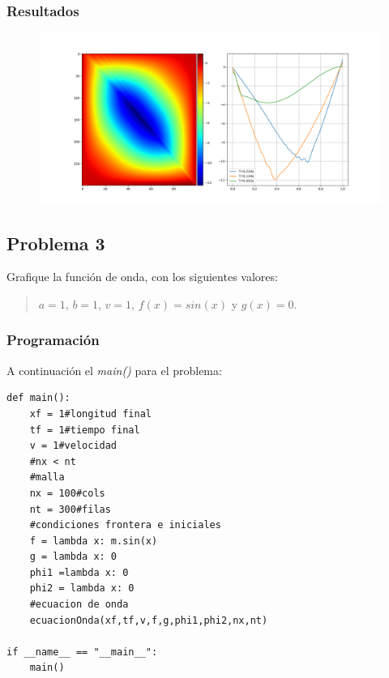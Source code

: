 \documentclass[a4paper,12pt]{article}
\newcommand{\eq}[1]{$#1$}
\begin{document}
    \subsubsection{Resultados}
    \begin{figure}[h]
        \centering
        \includegraphics[width=\textwidth]{graph2.png}
    \end{figure}

    \subsection{Problema 3}
    Grafique la función de onda, con los siguientes valores:
    \begin{quote}
        \centering
        \eq{a = 1}, \eq{b = 1}, \eq{v = 1}, \eq{f(x) = sin(x)} y \eq{g(x) = 0}.
    \end{quote}
    \subsubsection{Programación}
    A continuación el \emph{main()} para el problema:

\begin{lstlisting}[frame=single]
    def main():
    xf = 1#longitud final
    tf = 1#tiempo final
    v = 1#velocidad 
    #nx < nt
    #malla
    nx = 100#cols
    nt = 300#filas
    #condiciones frontera e iniciales
    f = lambda x: m.sin(x)
    g = lambda x: 0
    phi1 =lambda x: 0
    phi2 = lambda x: 0
    #ecuacion de onda
    ecuacionOnda(xf,tf,v,f,g,phi1,phi2,nx,nt)

if __name__ == "__main__":
    main()
\end{lstlisting}
\end{document}
